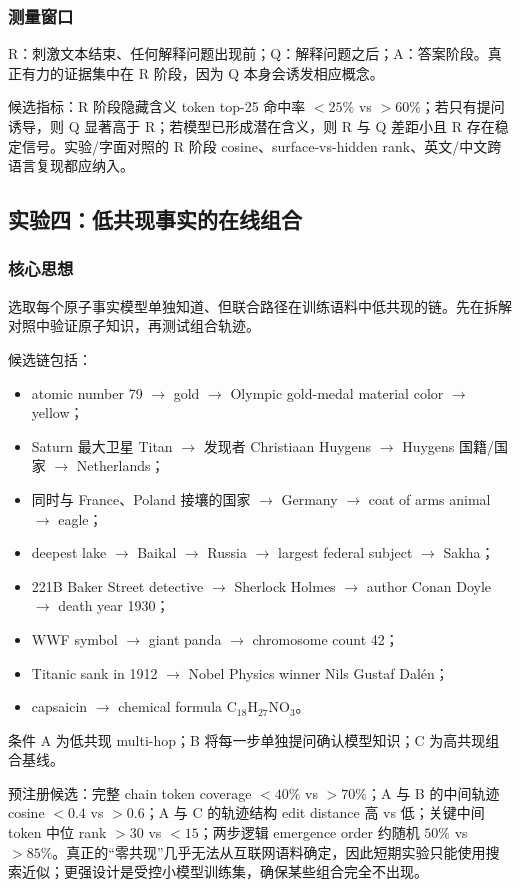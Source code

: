 \documentclass[10.5pt,a4paper]{ctexart}
\begin{document}
\subsubsection{测量窗口}
R：刺激文本结束、任何解释问题出现前；Q：解释问题之后；A：答案阶段。真正有力的证据集中在 R 阶段，因为 Q 本身会诱发相应概念。

候选指标：R 阶段隐藏含义 token top-25 命中率 $<25\%$ vs $>60\%$；若只有提问诱导，则 Q 显著高于 R；若模型已形成潜在含义，则 R 与 Q 差距小且 R 存在稳定信号。实验/字面对照的 R 阶段 cosine、surface-vs-hidden rank、英文/中文跨语言复现都应纳入。

\subsection{实验四：低共现事实的在线组合}
\subsubsection{核心思想}
选取每个原子事实模型单独知道、但联合路径在训练语料中低共现的链。先在拆解对照中验证原子知识，再测试组合轨迹。

候选链包括：
\begin{itemize}
  \item atomic number 79 $\to$ gold $\to$ Olympic gold-medal material color $\to$ yellow；
  \item Saturn 最大卫星 Titan $\to$ 发现者 Christiaan Huygens $\to$ Huygens 国籍/国家 $\to$ Netherlands；
  \item 同时与 France、Poland 接壤的国家 $\to$ Germany $\to$ coat of arms animal $\to$ eagle；
  \item deepest lake $\to$ Baikal $\to$ Russia $\to$ largest federal subject $\to$ Sakha；
  \item 221B Baker Street detective $\to$ Sherlock Holmes $\to$ author Conan Doyle $\to$ death year 1930；
  \item WWF symbol $\to$ giant panda $\to$ chromosome count 42；
  \item Titanic sank in 1912 $\to$ Nobel Physics winner Nils Gustaf Dalén；
  \item capsaicin $\to$ chemical formula $\mathrm{C_{18}H_{27}NO_3}$。
\end{itemize}
条件 A 为低共现 multi-hop；B 将每一步单独提问确认模型知识；C 为高共现组合基线。

预注册候选：完整 chain token coverage $<40\%$ vs $>70\%$；A 与 B 的中间轨迹 cosine $<0.4$ vs $>0.6$；A 与 C 的轨迹结构 edit distance 高 vs 低；关键中间 token 中位 rank $>30$ vs $<15$；两步逻辑 emergence order 约随机 $50\%$ vs $>85\%$。真正的“零共现”几乎无法从互联网语料确定，因此短期实验只能使用搜索近似；更强设计是受控小模型训练集，确保某些组合完全不出现。
\end{document}
